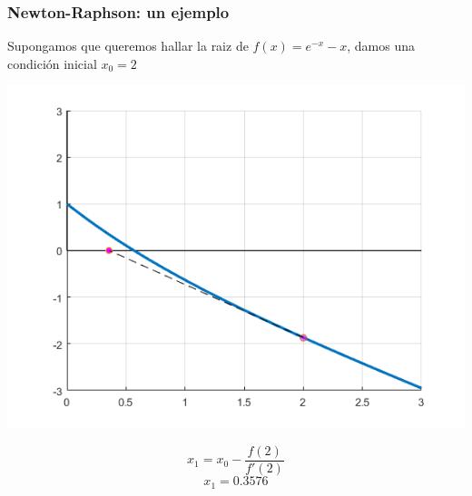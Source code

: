 \documentclass[xcolor=svgnames]{beamer} %
\theoremstyle{plain}
\theoremstyle{definition}
\begin{document}
\begin{frame}
	\frametitle{Newton-Raphson: un ejemplo}

Supongamos que queremos hallar la raiz de $f(x) = e^{-x} -x$,
damos una condición inicial $x_0=2$


\begin{minipage}{.7\linewidth}
\includegraphics[width=\linewidth]{nr_example/iter1.png} 

\end{minipage}  \begin{minipage}{.25\linewidth}

$$ x_1 = x_0 - \frac{f(2)}{f'(2)}$$
$$ x_1 = 0.3576$$
\end{minipage}

\end{frame}
\end{document}
